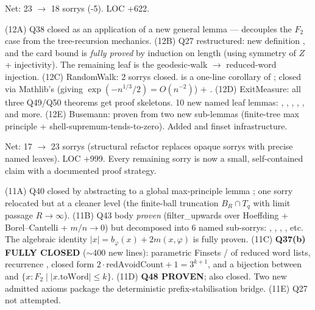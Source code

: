 \documentclass[11pt,a4paper]{article}
\theoremstyle{plain}
\theoremstyle{definition}
\begin{document}
Net: 23 $\to$ 18 sorrys (-5). LOC +622.

(12A) Q38  closed as an application of a
new general lemma  — decouples the $F_2$
case from the tree-recursion mechanics.
(12B) Q27  restructured: new definition
, and the card bound
 is \emph{fully proved} by induction
on length (using symmetry of $Z$ +  injectivity).
The remaining leaf is the geodesic-walk $\to$ reduced-word injection.
(12C) RandomWalk: 2 sorrys closed.
 is a one-line corollary of
; 
closed via Mathlib's  (giving
$\exp(-n^{1/3}/2) = O(n^{-2})$) $+$ .
(12D) ExitMeasure: all three Q49/Q50 theorems get proof skeletons.
10 new named leaf lemmas: ,
,
,
,
,
and more.
(12E) Busemann:  proven from
two new sub-lemmas (finite-tree max principle +
shell-supremum-tends-to-zero). Added  and
 finset infrastructure.

Net: 17 $\to$ 23 sorrys (structural refactor replaces opaque sorrys
with precise named leaves). LOC +999. Every remaining sorry is now
a small, self-contained claim with a documented proof strategy.

(11A) Q40  closed by abstracting to a
global max-principle lemma ;
one sorry relocated but at a cleaner level (the finite-ball truncation
$B_R \cap T_q$ with limit passage $R \to \infty$).
(11B) Q43  body \emph{proven}
(filter\_upwards over Hoeffding + Borel--Cantelli + $m/n \to 0$) but
decomposed into 6 named sub-sorrys: ,
,
,
, etc. The algebraic identity
$|x| = b_\varphi(x) + 2m(x,\varphi)$ is fully proven.
(11C) \textbf{Q37(b)  FULLY CLOSED}
($\sim$400 new lines): parametric Finsets /
of reduced word lists, recurrence
, closed form
$2 \cdot \text{redAvoidCount} + 1 = 3^{k+1}$, and a bijection
 between  and
$\{x : F_2 \mid |x.\text{toWord}| \leq k\}$.
(11D) \textbf{Q48  PROVEN};
 also closed. Two new admitted axioms
package the deterministic prefix-stabilisation bridge.
(11E) Q27 not attempted.
\end{document}
